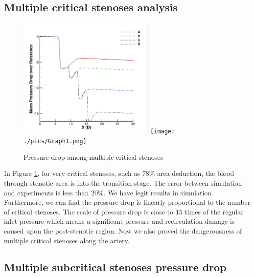 \subsection{Multiple critical stenoses analysis}

\begin{figure}[H]
	\centering
	\includegraphics[trim= 1mm 0mm 1mm 0mm,clip,width=0.60\textwidth]{./pics/exper.png}
	\texttt{[image: ./pics/Graph1.png]}
	\caption{Pressure drop among multiple critical stenoses}
	\label{fig: Pressure drop among multiple critical stenoses}
\end{figure}

In Figure \ref{fig: Pressure drop among multiple critical stenoses}, for very critical stenoses, such as $ 78\% $ area deduction, the blood through stenotic area is into the transition stage. The error between simulation and experiments is less than $ 20\% $. We have legit results in simulation. Furthermore, we can find the pressure drop is linearly proportional to the number of critical stenoses. The scale of pressure drop is close to $ 15 $ times of the regular inlet pressure which means a significant pressure and recirculation damage is caused upon the post-stenotic region. Now we also proved the dangerousness of multiple critical stenoses along the artery.


\subsection{Multiple subcritical stenoses pressure drop}

